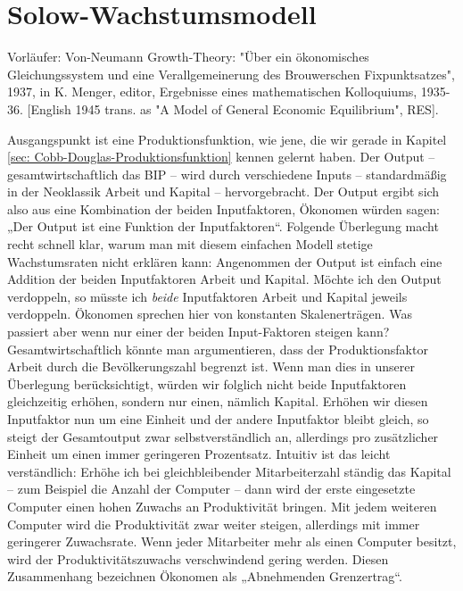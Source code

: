 \section{Solow-Wachstumsmodell} \label{sec: Solow-Modell}



Vorläufer: Von-Neumann Growth-Theory: 
"Über ein ökonomisches Gleichungssystem und eine Verallgemeinerung des Brouwerschen Fixpunktsatzes",  1937, in K. Menger, editor, Ergebnisse eines mathematischen Kolloquiums, 1935-36. [English 1945 trans. as "A Model of General Economic Equilibrium", RES].

Ausgangspunkt ist eine Produktionsfunktion, wie jene, die wir gerade in Kapitel \ref{sec: Cobb-Douglas-Produktionsfunktion} kennen gelernt haben.  Der Output – gesamtwirtschaftlich das BIP – wird durch verschiedene Inputs – standardmäßig in der Neoklassik Arbeit und Kapital – hervorgebracht. Der Output ergibt sich also aus eine Kombination der beiden Inputfaktoren, Ökonomen würden sagen: „Der Output ist eine Funktion der Inputfaktoren“. 
Folgende Überlegung macht recht schnell klar, warum man mit diesem einfachen Modell stetige Wachstumsraten nicht erklären kann: Angenommen der Output ist einfach eine Addition der beiden Inputfaktoren Arbeit und Kapital. Möchte ich den Output verdoppeln, so müsste ich \textit{beide} Inputfaktoren Arbeit und Kapital jeweils verdoppeln. Ökonomen sprechen hier von konstanten Skalenerträgen. 
Was passiert aber wenn nur einer der beiden Input-Faktoren steigen kann? Gesamtwirtschaftlich könnte man argumentieren, dass der Produktionsfaktor Arbeit durch die Bevölkerungszahl begrenzt ist. Wenn man dies in unserer Überlegung berücksichtigt, würden wir folglich nicht beide Inputfaktoren gleichzeitig erhöhen, sondern nur einen, nämlich Kapital. Erhöhen wir diesen Inputfaktor nun um eine Einheit und der andere Inputfaktor bleibt gleich, so steigt der Gesamtoutput zwar selbstverständlich an, allerdings pro zusätzlicher Einheit um einen immer geringeren Prozentsatz. Intuitiv ist das leicht verständlich: Erhöhe ich bei gleichbleibender Mitarbeiterzahl ständig das Kapital – zum Beispiel die Anzahl der Computer – dann wird der erste eingesetzte Computer einen hohen Zuwachs an Produktivität bringen. Mit jedem weiteren Computer wird die Produktivität zwar weiter steigen, allerdings mit immer geringerer Zuwachsrate. Wenn jeder Mitarbeiter mehr als einen Computer besitzt, wird der Produktivitätszuwachs verschwindend gering werden. Diesen Zusammenhang bezeichnen Ökonomen als „Abnehmenden Grenzertrag“.

